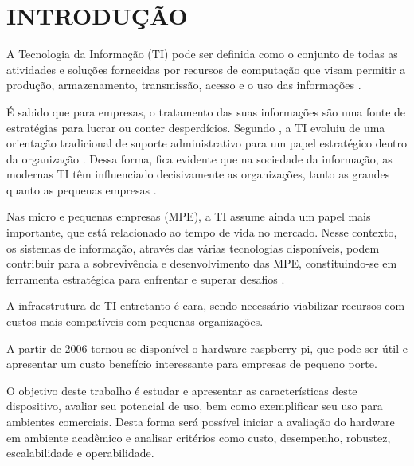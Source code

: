 \chapter{INTRODUÇÃO}

A Tecnologia da Informação (TI) pode ser definida como o conjunto de todas as atividades e soluções fornecidas por recursos de computação que visam permitir a produção, armazenamento, transmissão, acesso e o uso das informações \cite{WIKIPEDIA}.

É sabido que para empresas, o tratamento das suas informações são uma fonte de estratégias para lucrar ou conter desperdícios. Segundo , a TI evoluiu de uma orientação tradicional de suporte administrativo para um papel estratégico dentro da organização . Dessa forma, fica evidente que na sociedade da informação, as modernas TI têm influenciado decisivamente as organizações, tanto as grandes quanto as pequenas empresas \cite{CRISTINA}.

Nas micro e pequenas empresas (MPE), a TI assume ainda um papel mais importante, que está relacionado ao tempo de vida no mercado. Nesse contexto, os sistemas de informação, através das várias tecnologias disponíveis, podem contribuir para a sobrevivência e desenvolvimento das MPE, constituindo-se em ferramenta estratégica para enfrentar e superar desafios \cite{VALDIR}.

A infraestrutura de TI entretanto é cara, sendo necessário viabilizar recursos com custos mais compatíveis com pequenas organizações.

A partir de 2006 tornou-se disponível o hardware raspberry pi,  que pode ser útil e apresentar um custo benefício interessante para empresas de pequeno porte.

O objetivo deste trabalho é estudar e apresentar as características deste dispositivo, avaliar seu potencial de uso, bem como exemplificar seu uso para ambientes comerciais. Desta forma será possível iniciar a avaliação do hardware em ambiente acadêmico e analisar critérios como custo, desempenho, robustez, escalabilidade e operabilidade.